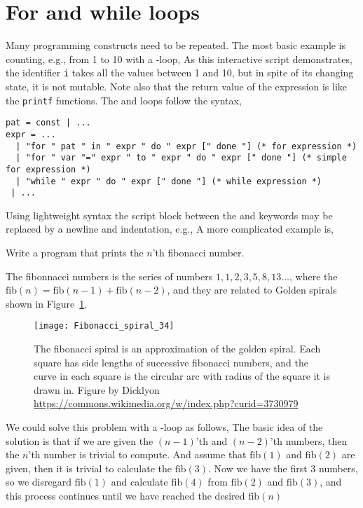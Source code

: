 \section{For and while loops}
Many programming constructs need to be repeated. The most basic example is counting, e.g., from 1 to 10 with a -loop,
%
%
As this interactive script demonstrates, the identifier \lstinline!i! takes all the values between 1 and 10, but in spite of its changing state, it is not mutable. Note also that the return value of the  expression is \token{()} like the \lstinline!printf! functions. The  and  loops follow the syntax,
\begin{lstlisting}[language=ebnf]
pat = const | ...
expr = ... 
  | "for " pat " in " expr " do " expr [" done "] (* for expression *)
  | "for " var "=" expr " to " expr " do " expr [" done "] (* simple for expression *)
  | "while " expr " do " expr [" done "] (* while expression *)
 | ...
\end{lstlisting}
Using lightweight syntax the script block between the  and  keywords may be replaced by a newline and indentation, e.g.,
%
%
A more complicated example is,
\begin{problem}
  Write a program that prints the $n$'th fibonacci number.
\end{problem}
The fibonnacci numbers is the series of numbers $1,1,2,3,5,8,13\dots$, where the $\text{fib}(n) = \text{fib}(n-1)+\text{fib}(n-2)$, and they are related to Golden spirals shown in Figure~\ref{fig:goldenSpiral}.
\begin{figure}
  \centering
  \texttt{[image: Fibonacci\_spiral\_34]}
  \caption{The fibonacci spiral is an approximation of the golden spiral. Each square has side lengths of successive fibonacci numbers, and the curve in each square is the circular arc with radius of the square it is drawn in. Figure by Dicklyon \url{https://commons.wikimedia.org/w/index.php?curid=3730979}}
  \label{fig:goldenSpiral}
\end{figure}
We could solve this problem with a -loop as follows,
%
%
The basic idea of the solution is that if we are given the $(n-1)$'th and $(n-2)$'th numbers, then the $n$'th number is trivial to compute. And assume that $\text{fib}(1)$ and $\text{fib}(2)$ are given, then it is trivial to calculate the $\text{fib}(3)$. Now we have the first 3 numbers, so we disregard $\text{fib}(1)$ and calculate $\text{fib}(4)$ from $\text{fib}(2)$ and $\text{fib}(3)$, and this process continues until we have reached the desired $\text{fib}(n)$

